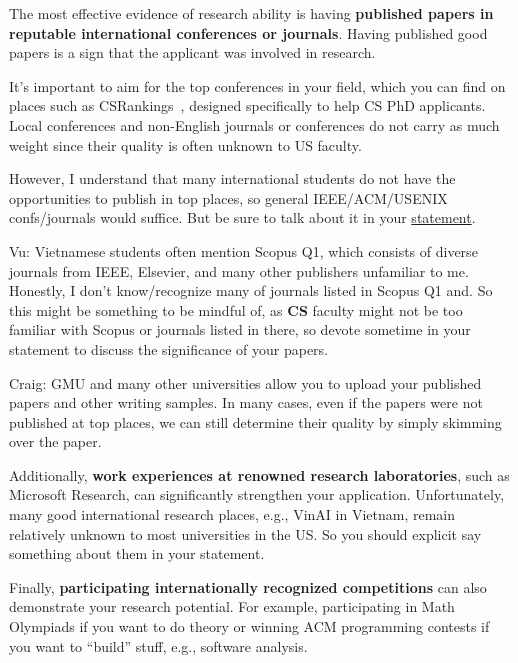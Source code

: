 \documentclass[11pt]{article}
\newenvironment{commentbox}{
 \small
    \begin{cbox}
 }{
   \end{cbox}
}
\begin{document}
The most effective evidence of research ability is having \textbf{published papers in reputable international conferences or journals}.
Having published good papers is a sign that the applicant was involved in research.

It's important to aim for the top conferences in your field, which you can
find on places such as CSRankings~\cite{csrankings}, designed specifically to help CS PhD
applicants. Local conferences and non-English journals or conferences do
not carry as much weight since their quality is often unknown to US
faculty.

However, I understand that many international students do not have the opportunities to publish in top places, so general IEEE/ACM/USENIX confs/journals would suffice.  But be sure to talk about it in your \hyperref[sec:research-statement]{statement}.

\begin{commentbox}
Vu: Vietnamese students often mention Scopus Q1, which consists of diverse journals from IEEE, Elsevier, and many other publishers unfamiliar to me.  Honestly, I don't know/recognize many of journals listed in Scopus Q1 and. So this might be something to be mindful of, as \textbf{CS} faculty might not be too familiar with Scopus or journals listed in there, so devote sometime in your statement to discuss the significance of your papers.
\end{commentbox}

\begin{commentbox}
Craig: GMU and many other universities allow you to upload your published papers and other writing samples. In many cases, even if the papers were not published at top places, we can still determine their quality by simply skimming over the paper.  
\end{commentbox}

Additionally, \textbf{work experiences at renowned research laboratories}, such as Microsoft Research, can significantly strengthen your
application.  Unfortunately, many good international research places, e.g., VinAI in Vietnam, remain relatively unknown to most universities in the US. So you should explicit say something about them in your statement.

Finally, \textbf{participating internationally recognized competitions} can also demonstrate your research potential.
For example, participating in Math Olympiads if you want to do theory or  winning ACM programming contests if you want to ``build'' stuff, e.g., software analysis.
\end{document}
